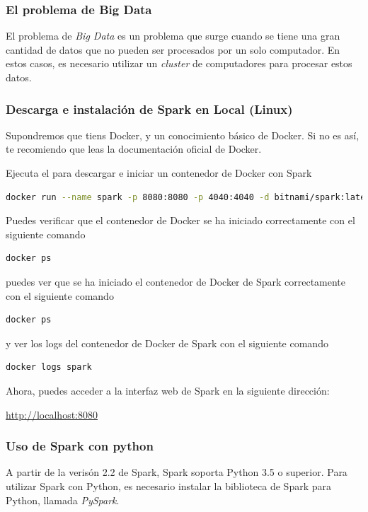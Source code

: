 \documentclass[11pt,oneside]{report}
\theoremstyle{plain}
\theoremstyle{definition}
\begin{document}
\subsubsection*{El problema de Big Data}

El problema de \emph{Big Data} es un problema que surge cuando se tiene una gran cantidad de datos que no pueden ser procesados por un solo computador. En estos casos, es necesario utilizar un \emph{cluster} de computadores para procesar estos datos.

\subsubsection*{Descarga e instalación de Spark en Local (Linux)}

Supondremos que tiens Docker, y un conocimiento básico de Docker. Si no es así, te recomiendo que leas la documentación oficial de Docker.

Ejecuta el para descargar e iniciar un contenedor de Docker con Spark
\begin{lstlisting}[language=bash]
    docker run --name spark -p 8080:8080 -p 4040:4040 -d bitnami/spark:latest
\end{lstlisting}

Puedes verificar que el contenedor de Docker se ha iniciado correctamente con el siguiente comando
\begin{lstlisting}[language=bash]
    docker ps
\end{lstlisting}

puedes ver que se ha iniciado el contenedor de Docker de Spark correctamente con el siguiente comando
\begin{lstlisting}[language=bash]
    docker ps
\end{lstlisting}

y ver los logs del contenedor de Docker de Spark con el siguiente comando
\begin{lstlisting}[language=bash]
    docker logs spark
\end{lstlisting}

Ahora, puedes acceder a la interfaz web de Spark en la siguiente dirección: 

\href{http://localhost:8080}{http://localhost:8080}

\subsubsection*{Uso de Spark con python}

A partir de la verisón 2.2 de Spark, Spark soporta Python 3.5 o superior. Para utilizar Spark con Python, es necesario instalar la biblioteca de Spark para Python, llamada \emph{PySpark}.
\end{document}
